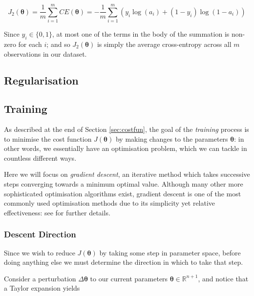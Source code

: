 \documentclass{article}[11pt]
\begin{document}
        $$
        J_2(\boldsymbol{\theta}) = \frac{1}{m} \sum_{i=1}^{m} CE(\boldsymbol{\theta}) = - \frac{1}{m} \sum_{i=1}^{m} \left( y_i \log(a_i) + (1 - y_i) \log(1 - a_i) \right)
        $$
        
        Since $y_i \in \{0, 1\}$, at most one of the terms in the body of the summation is non-zero for each $i$; and so $J_2(\boldsymbol{\theta})$ is simply the average cross-entropy across all $m$ observations in our dataset.
    
    
    
    \subsection{Regularisation}
        
        
        
    \subsection{Training}
        
        As described at the end of Section \ref{sec:costfun}, the goal of the \textit{training} process is to minimise the cost function $J(\boldsymbol{\theta})$ by making changes to the parameters $\boldsymbol{\theta}$: in other words, we essentially have an optimisation problem, which we can tackle in countless different ways.
        
        Here we will focus on \textit{gradient descent}, an iterative method which takes successive steps converging towards a minimum optimal value. Although many other more sophisticated optimisation algorithms exist, gradient descent is one of the most commonly used optimisation methods due to its simplicity yet relative effectiveness: see \cite{lecun_backprop} for further details.
        
        
        \subsubsection{Descent Direction}
            
            Since we wish to reduce $J(\boldsymbol{\theta})$ by taking some step in parameter space, before doing anything else we must determine the direction in which to take that step.
            
            Consider a perturbation $\Delta \boldsymbol{\theta}$ to our current parameters $\boldsymbol{\theta} \in \mathbb{R}^{n+1}$, and notice that a Taylor expansion yields
            
\end{document}
